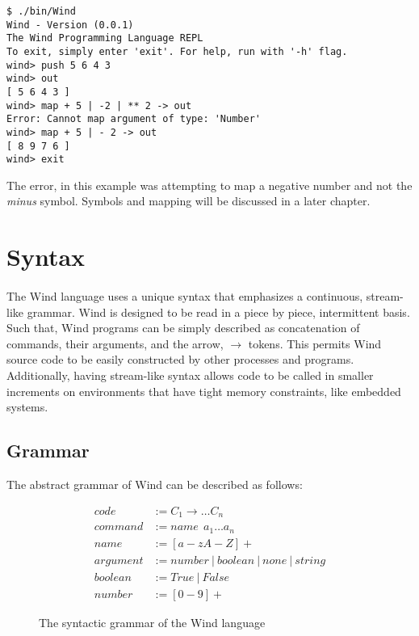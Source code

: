 \begin{verbatim}
$ ./bin/Wind
Wind - Version (0.0.1)
The Wind Programming Language REPL
To exit, simply enter 'exit'. For help, run with '-h' flag.
wind> push 5 6 4 3
wind> out
[ 5 6 4 3 ]
wind> map + 5 | -2 | ** 2 -> out
Error: Cannot map argument of type: 'Number'
wind> map + 5 | - 2 -> out          
[ 8 9 7 6 ]
wind> exit
\end{verbatim}

\par The error, in this example was attempting to map a negative number and not the \emph{minus} symbol. Symbols and mapping will be discussed in a later chapter.

\section{Syntax}

\paragraph{  } The Wind language uses a unique syntax that emphasizes a continuous, stream-like grammar. Wind is designed to be read in a piece by piece, intermittent basis. Such that, Wind programs can be simply described as concatenation of commands, their arguments, and the arrow, $\longrightarrow$ tokens. This permits Wind source code to be easily constructed by other processes and programs. Additionally, having stream-like syntax allows code to be called in smaller increments on environments that have tight memory constraints, like embedded systems.

\subsection{Grammar}

The abstract grammar of Wind can be described as follows:

\begin{figure}[h]
\begin{align*}
 code &:= C_1 \rightarrow \dots C_n \\
 command &:= name\:\: a_1 \dots a_n \\
 name &:= [a-zA-Z]+ \\
 argument &:= number\: |\: boolean \:|\: none \:|\: string \\
 boolean &:= True \: | \: False \\
 number &:= [0-9]+
\end{align*}
\caption{The syntactic grammar of the Wind language}
\end{figure}

